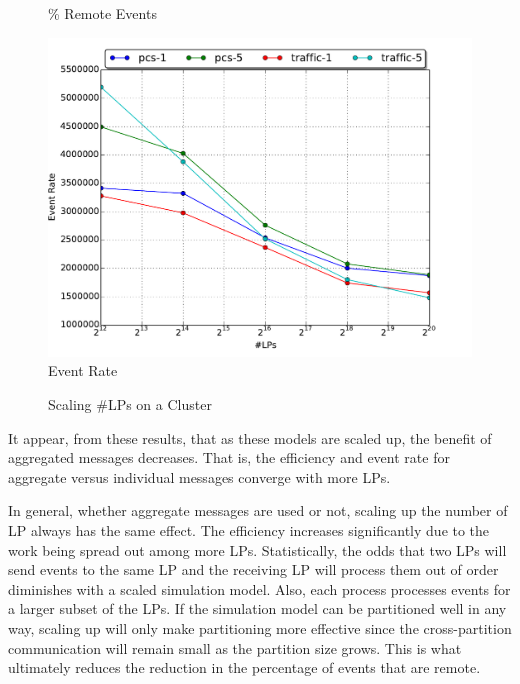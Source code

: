 \documentclass[11pt]{book}
\begin{document}
\begin{figure}
\begin{minipage}{.5\textwidth}
\begin{center}
      \% Remote Events \\
    \end{center}
  \end{minipage}
  \centering
  \begin{minipage}{.5\textwidth}
    \begin{center}
      \includegraphics[width=\textwidth,keepaspectratio,quiet]{figs/scale/scale_event_rate.pdf} \\
      Event Rate \\
    \end{center}
  \end{minipage}
  \caption{Scaling \#LPs on a Cluster}\label{scaling}
\end{figure}

It appear, from these results, that as these models are scaled up, the benefit of aggregated
messages decreases.  That is, the efficiency and event rate for aggregate versus individual
messages converge with more LPs.

In general, whether aggregate messages are used or not, scaling up the number of LP always has
the same effect.  The efficiency increases significantly due to the work being spread out among
more LPs.  Statistically, the odds that two LPs will send events to the same LP and the receiving
LP will process them out of order diminishes with a scaled simulation model.
Also, each process processes events for a larger subset of the LPs.  If the simulation model can
be partitioned well in any way, scaling up will only make partitioning more effective since
the cross-partition communication will remain small as the partition size grows.  This is what
ultimately reduces the reduction in the percentage of events that are remote.
\end{document}

